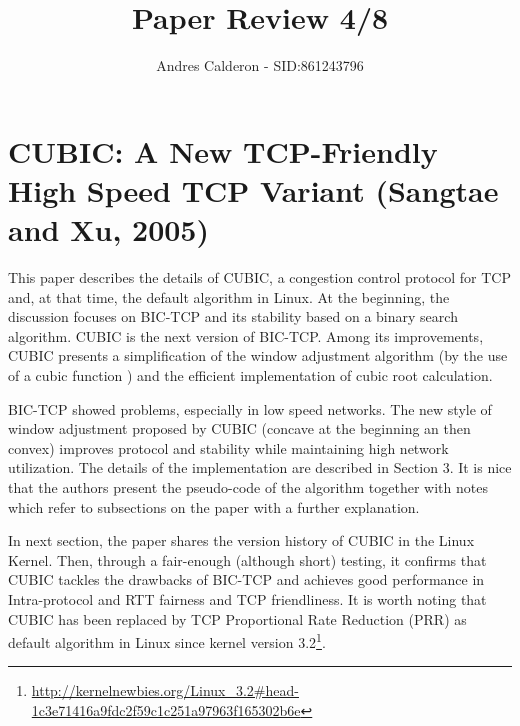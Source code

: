 \documentclass[a4paper,10pt]{scrartcl}
\title{Paper Review 4/8}
\author{Andres Calderon - SID:861243796}
\begin{document}
\maketitle
\thispagestyle{empty}

\section*{CUBIC: A New TCP-Friendly High Speed TCP Variant (Sangtae and Xu, 2005)}
This paper describes the details of CUBIC, a congestion control protocol for TCP and, at that time, the default algorithm in Linux.  At the beginning, the discussion focuses on BIC-TCP and its stability based on a binary search algorithm.  CUBIC is the next version of BIC-TCP.  Among its improvements, CUBIC presents a simplification of the window adjustment algorithm (by the use of a cubic function ) and the efficient implementation of cubic root calculation.  

BIC-TCP showed problems, especially in low speed networks. The new style of window adjustment proposed by CUBIC (concave at the beginning an then convex) improves protocol and stability while maintaining high network utilization.  The details of the implementation are described in Section 3.  It is nice that the authors present the pseudo-code of the algorithm together with notes which refer to subsections on the paper with a further explanation.

In next section, the paper shares the version history of CUBIC in the Linux Kernel.  Then, through a fair-enough (although short) testing, it confirms that CUBIC tackles the drawbacks of BIC-TCP and achieves good performance in Intra-protocol and RTT fairness and TCP friendliness.  It is worth noting that CUBIC has been replaced by TCP Proportional Rate Reduction (PRR) as default algorithm in Linux since kernel version 3.2\footnote{\url{http://kernelnewbies.org/Linux_3.2\#head-1c3e71416a9fdc2f59c1c251a97963f165302b6e}}.

\end{document}
